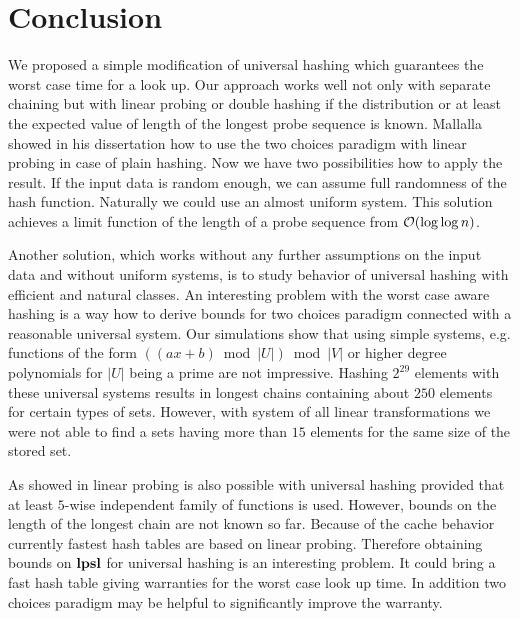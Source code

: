 \section{Conclusion}
\label{section-conclusion}
We proposed a simple modification of universal hashing which guarantees the worst case time for a look up. Our approach works well not only with separate chaining but with linear probing or double hashing if the distribution or at least the expected value of length of the longest probe sequence is known. Mallalla showed in his dissertation \cite{Malalla:2004:THS:1124034} how to use the two choices paradigm with linear probing in case of plain hashing. Now we have two possibilities how to apply the result. If the input data is random enough, we can assume full randomness of the hash function. Naturally we could use an almost uniform system. This solution achieves a limit function of the length of a probe sequence from $\mathcal{O}(\log \log n)$.

Another solution, which works without any further assumptions on the input data and without uniform systems, is to study behavior of universal hashing with efficient and natural classes. An interesting problem with the worst case aware hashing is a way how to derive bounds for two choices paradigm connected with a reasonable universal system. Our simulations show that using simple systems, e.g. functions of the form $((ax + b) \bmod |U|) \bmod |V|$ or higher degree polynomials for $|U|$ being a prime are not impressive. Hashing $2^{29}$ elements with these universal systems results in longest chains containing about $250$ elements for certain types of sets. However, with system of all linear transformations we were not able to find a sets having more than $15$ elements for the same size of the stored set.

As showed in \cite{DBLP:conf/alenex/ThorupZ10} linear probing is also possible with universal hashing provided that at least $5$-wise independent family of functions is used. However, bounds on the length of the longest chain are not known so far. Because of the cache behavior currently fastest hash tables are based on linear probing. Therefore obtaining bounds on $\mathbf{lpsl}$ for universal hashing is an interesting problem. It could bring a fast hash table giving warranties for the worst case look up time. In addition two choices paradigm may be helpful to significantly improve the warranty.